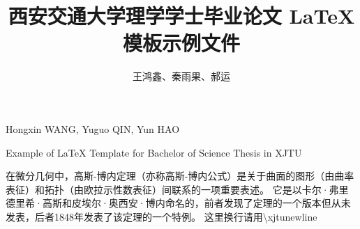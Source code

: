 \documentclass[%
               amsthm,
              ]{xjtubsc}
\begin{document}

\author{王鸿鑫、秦雨果、郝运}{Hongxin WANG, Yuguo QIN, Yun HAO}	%
\title{西安交通大学理学学士毕业论文 \LaTeX{} 模板示例文件}{Example of \LaTeX{} Template for Bachelor of Science Thesis in XJTU}	%

{}	%

\begin{INFObackground} %

在微分几何中，高斯-博内定理（亦称高斯-博内公式）是关于曲面的图形（由曲率表征）和拓扑（由欧拉示性数表征）间联系的一项重要表述。\xjtunewline
它是以卡尔·弗里德里希·高斯和皮埃尔·奥西安·博内命名的，前者发现了定理的一个版本但从未发表，后者1848年发表了该定理的一个特例。\xjtunewline
这里换行请用\textbackslash xjtunewline

\end{INFObackground}

\begin{INFOdata} %


\end{INFOdata}

\begin{INFOtask} %


\end{INFOtask}

\begin{INFOrequirement} %


\end{INFOrequirement}

\begin{INFOsubmit} %


\end{INFOsubmit}

\begin{INFOreference} %


\end{INFOreference}

\frontmatter
\end{document}
